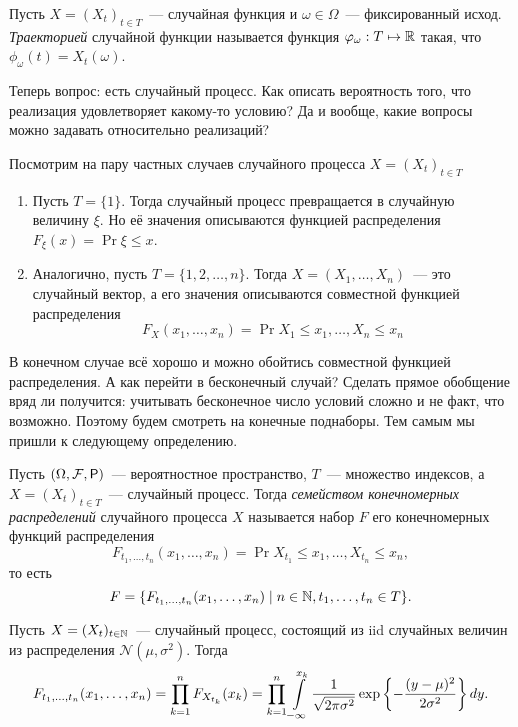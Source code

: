 \begin{definition}
	Пусть \(X = (X_{t})_{t \in T}\)~--- случайная функция и \(\omega \in 
	\Omega\)~--- фиксированный исход. \emph{Траекторией} случайной функции
	называется функция \(\varphi_{\omega} : T \mapsto \mathbb{R}\) такая, что 
	\(\phi_{\omega}(t) = X_{t}(\omega)\). 
\end{definition}

Теперь вопрос: есть случайный процесс. Как описать вероятность того, что 
реализация удовлетворяет какому-то условию? Да и вообще, какие вопросы можно 
задавать относительно реализаций? 

Посмотрим на пару частных случаев случайного процесса \(X = (X_{t})_{t \in T}\)
\begin{enumerate}
	\item Пусть \(T = \{1\}\). Тогда случайный процесс превращается в случайную 
	величину \(\xi\). Но её значения описываются функцией распределения 
	\(F_{\xi}(x) = \Pr{\xi \leq x}\).
	\item Аналогично, пусть \(T = \{1, 2, \dots, n\}\). Тогда \(X = (X_{1}, 
	\dots, X_{n})\)~--- это случайный вектор, а его значения описываются 
	совместной функцией распределения 
	\[
	F_{X}(x_{1}, \dots, x_{n}) = \Pr{X_{1} \leq x_{1}, \dots, X_{n} \leq 
		x_{n}}
	\]
\end{enumerate}

В конечном случае всё хорошо и можно обойтись совместной функцией 
распределения. А как перейти в бесконечный случай? Сделать прямое обобщение 
вряд ли получится: учитывать бесконечное число условий сложно и не факт, что 
возможно. Поэтому будем смотреть на конечные поднаборы. Тем 
самым мы пришли к следующему определению.
\begin{definition}
	Пусть \((\Omega, \F, \Pr)\)~--- вероятностное пространство, \(T\)~--- 
	множество индексов, а \(X = (X_{t})_{t \in T}\)~--- случайный процесс. 
	Тогда \emph{семейством конечномерных распределений} случайного процесса 
	\(X\) называется набор \(F\) его конечномерных функций распределения
	\[
	F_{t_{1}, \dots, t_{n}}(x_{1}, \dots, x_{n}) = \Pr{X_{t_{1}} \leq 
		x_{1}, \ldots, X_{t_{n}} \leq x_{n}},
	\]
	то есть
	\[
	F = \{F_{t_{1}, \dots, t_{n}}(x_{1}, \dots, x_{n}) \mid n \in \mathbb{N}, 
	t_{1}, \dots, t_{n} \in T\}.
	\]
\end{definition}

\begin{example}
	Пусть \(X = (X_{t})_{t \in \mathbb{N}}\)~--- случайный процесс, состоящий из iid 
	случайных величин из распределения \(\mathcal{N}(\mu, \sigma^{2})\). Тогда
	\[
	F_{t_{1}, \dots, t_{n}}(x_{1}, \dots, x_{n}) = \prod_{k = 1}^{n} 
	F_{X_{t_{k}}}(x_{k}) = \prod_{k = 1}^{n} \int\limits_{-\infty}^{x_{k}} 
	\frac{1}{\sqrt{2\pi\sigma^{2}}}\exp\left\{-\frac{(y - 
		\mu)^{2}}{2\sigma^{2}}\right\}\mathop{}\!d y.
	\]
\end{example}

